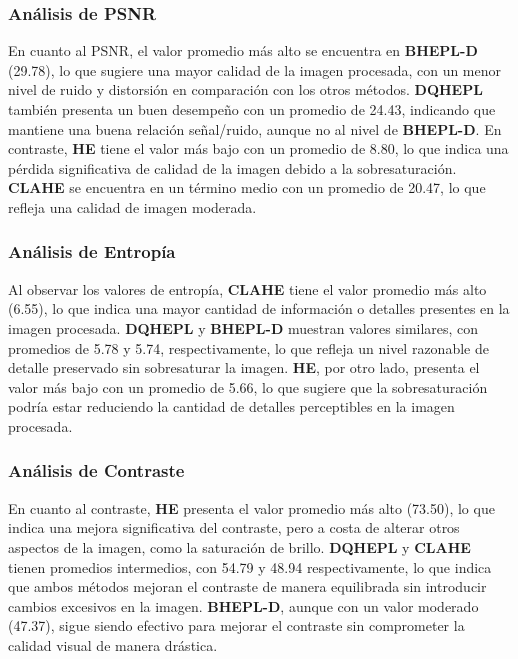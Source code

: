 \documentclass[sigchi]{acmart}
\begin{document}
\subsubsection{Análisis de PSNR}
\label{subsubsec:analisis_psnr}

En cuanto al PSNR, el valor promedio más alto se encuentra en \textbf{BHEPL-D} (29.78), lo que
sugiere una mayor calidad de la imagen procesada, con un menor nivel de ruido y distorsión en
comparación con los otros métodos. \textbf{DQHEPL} también presenta un buen desempeño con un
promedio de 24.43, indicando que mantiene una buena relación señal/ruido, aunque no al nivel de
\textbf{BHEPL-D}. En contraste, \textbf{HE} tiene el valor más bajo con un promedio de 8.80, lo
que indica una pérdida significativa de calidad de la imagen debido a la sobresaturación.
\textbf{CLAHE} se encuentra en un término medio con un promedio de 20.47, lo que refleja una
calidad de imagen moderada.

\subsubsection{Análisis de Entropía}
\label{subsubsec:analisis_entropia}

Al observar los valores de entropía, \textbf{CLAHE} tiene el valor promedio más alto (6.55), lo
que indica una mayor cantidad de información o detalles presentes en la imagen procesada.
\textbf{DQHEPL} y \textbf{BHEPL-D} muestran valores similares, con promedios de 5.78 y 5.74,
respectivamente, lo que refleja un nivel razonable de detalle preservado sin sobresaturar la
imagen. \textbf{HE}, por otro lado, presenta el valor más bajo con un promedio de 5.66, lo que
sugiere que la sobresaturación podría estar reduciendo la cantidad de detalles perceptibles en
la imagen procesada.

\subsubsection{Análisis de Contraste}
\label{subsubsec:analisis_contraste}

En cuanto al contraste, \textbf{HE} presenta el valor promedio más alto (73.50), lo que indica
una mejora significativa del contraste, pero a costa de alterar otros aspectos de la imagen,
como la saturación de brillo. \textbf{DQHEPL} y \textbf{CLAHE} tienen promedios intermedios,
con 54.79 y 48.94 respectivamente, lo que indica que ambos métodos mejoran el contraste de
manera equilibrada sin introducir cambios excesivos en la imagen. \textbf{BHEPL-D}, aunque con
un valor moderado (47.37), sigue siendo efectivo para mejorar el contraste sin comprometer la
calidad visual de manera drástica.
\end{document}
